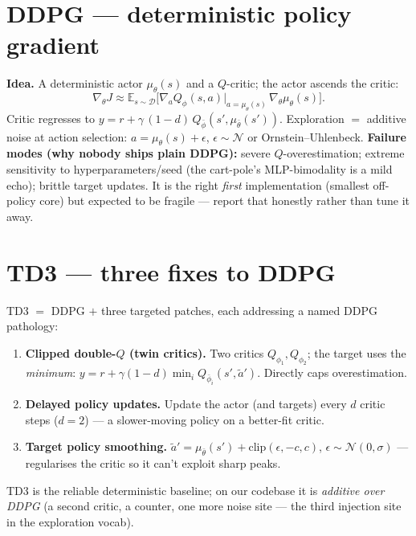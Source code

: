 \documentclass[11pt]{article}
\begin{document}
\section{DDPG --- deterministic policy gradient}
\textbf{Idea.} A deterministic actor $\mu_\theta(s)$ and a $Q$-critic; the actor ascends the critic:
\[
\nabla_\theta J \approx \mathbb{E}_{s\sim\mathcal{D}}\big[\nabla_a Q_\phi(s,a)\big|_{a=\mu_\theta(s)}\,
\nabla_\theta \mu_\theta(s)\big].
\]
Critic regresses to $y = r + \gamma\,(1-d)\,Q_{\bar\phi}(s',\mu_{\bar\theta}(s'))$. Exploration $=$ additive
noise at action selection: $a = \mu_\theta(s) + \epsilon$, $\epsilon\sim\mathcal{N}$ or Ornstein--Uhlenbeck.
\textbf{Failure modes (why nobody ships plain DDPG):} severe $Q$-overestimation; extreme sensitivity to
hyperparameters/seed (the cart-pole's MLP-bimodality is a mild echo); brittle target updates. It is the right
\emph{first} implementation (smallest off-policy core) but expected to be fragile --- report that honestly
rather than tune it away.

\section{TD3 --- three fixes to DDPG}
TD3 $=$ DDPG $+$ three targeted patches, each addressing a named DDPG pathology:
\begin{enumerate}[nosep]
  \item \textbf{Clipped double-$Q$ (twin critics).} Two critics $Q_{\phi_1},Q_{\phi_2}$; the target uses the
        \emph{minimum}: $y = r + \gamma(1-d)\min_i Q_{\bar\phi_i}(s',\tilde a')$. Directly caps overestimation.
  \item \textbf{Delayed policy updates.} Update the actor (and targets) every $d$ critic steps ($d{=}2$) ---
        a slower-moving policy on a better-fit critic.
  \item \textbf{Target policy smoothing.} $\tilde a' = \mu_{\bar\theta}(s') + \mathrm{clip}(\epsilon,-c,c)$,
        $\epsilon\sim\mathcal{N}(0,\sigma)$ --- regularises the critic so it can't exploit sharp peaks.
\end{enumerate}
TD3 is the reliable deterministic baseline; on our codebase it is \emph{additive over DDPG} (a second critic,
a counter, one more noise site --- the third injection site in the exploration vocab).
\end{document}

